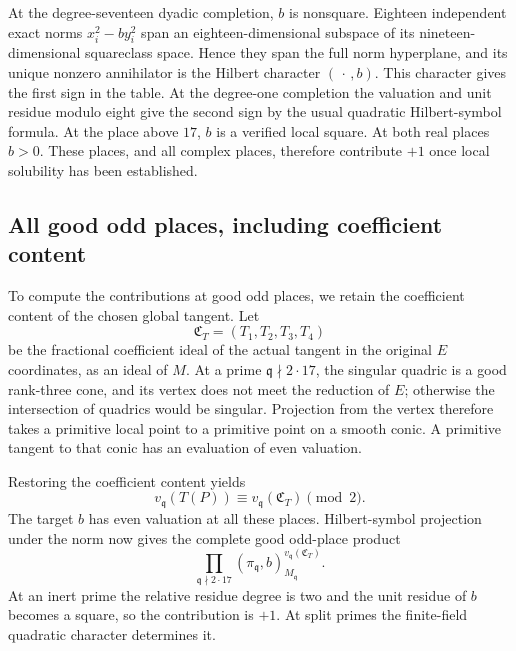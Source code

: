 \documentclass[11pt,a4paper]{article}
\theoremstyle{definition}\newtheorem{definition}[theorem]{Definition}
\theoremstyle{remark}\newtheorem{remark}[theorem]{Remark}
\begin{document}
At the degree-seventeen dyadic completion, $b$ is nonsquare.  Eighteen
independent exact norms $x_i^2-by_i^2$ span an eighteen-dimensional
subspace of its nineteen-dimensional squareclass space.  Hence they
span the full norm hyperplane, and its unique nonzero annihilator
is the Hilbert character $(\,\cdot\,,b)$.  This character gives the first sign in the table.  At the degree-one
completion the valuation and unit residue modulo eight give the
second sign by the usual quadratic Hilbert-symbol formula.
At the place above $17$, $b$ is a verified local square.  At both real
places $b>0$.  These places, and all complex places, therefore contribute
$+1$ once local solubility has been established.

\subsection{All good odd places, including coefficient content}

To compute the contributions at good odd places, we retain the coefficient content of the chosen global tangent.
Let
\[
 \mathfrak C_T=(T_1,T_2,T_3,T_4)
\]
be the fractional coefficient ideal of the actual tangent in the
original $E$ coordinates, as an ideal of $M$.  At a prime
$\mathfrak q\nmid2\cdot17$, the singular quadric is a good rank-three
cone, and its vertex does not meet the reduction of $E$; otherwise
the intersection of quadrics would be singular.  Projection from the
vertex therefore takes a primitive local point to a primitive point
on a smooth conic.  A primitive tangent to that conic has an evaluation of even valuation.  

Restoring the coefficient content yields
\[
 v_{\mathfrak q}(T(P))
       \equiv v_{\mathfrak q}(\mathfrak C_T)\pmod2.
\]
The target $b$ has even valuation at all these places.  Hilbert-symbol
projection under the norm now gives the complete good odd-place product
\begin{equation}\label{eq:odd-content-product}
 \prod_{\mathfrak q\nmid2\cdot17}
 (\pi_{\mathfrak q},b)_{M_{\mathfrak q}}^
                              {v_{\mathfrak q}(\mathfrak C_T)}.
\end{equation}
At an inert prime the relative residue degree is two and the unit
residue of $b$ becomes a square, so the contribution is $+1$.
At split primes the finite-field quadratic character determines it.
\end{document}
